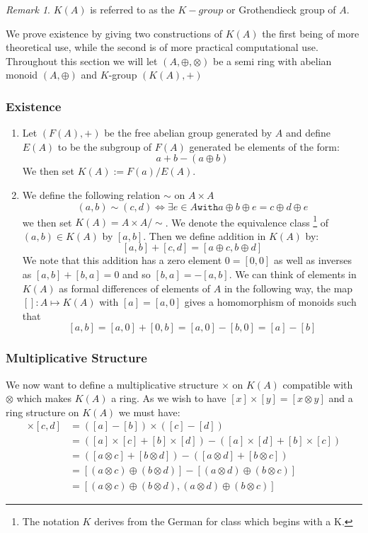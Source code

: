 \documentclass[a4paper,10pt]{article}
\theoremstyle{plain}%
\theoremstyle{definition}
\theoremstyle{remark}
\newtheorem{rem}{Remark}
\begin{document}
\begin{rem}
 $K(A)$ is referred to as the $K-group$ or Grothendieck group of $A$.
\end{rem}


We prove existence by giving two constructions of $K(A)$ the first being of more theoretical use, while the second 
is of more practical computational use. Throughout this section we will let $(A,\oplus,\otimes)$ be a semi ring with abelian monoid $(A,\oplus)$ and $K$-group $(K(A),+)$

\subsubsection{Existence}

\begin{enumerate}
 \item Let $(F(A),+)$ be the free abelian group generated by $A$ and define $E(A)$ to be the subgroup of $F(A)$
generated be elements of the form:
$$a+b-(a\oplus b)$$
We then set $K(A):=F(a)/E(A)$.
 \item We define the following relation $\sim$ on $A\times A$
$$(a,b)\sim (c,d) \iff \exists e\in A \mathtt{ with } a\oplus b\oplus e =c\oplus d\oplus e$$
we then set $K(A)=A\times A/\sim$. We denote the equivalence class
\footnote{The notation $K$ derives from the German for class which begins with a K.}
 of $(a,b)\in K(A)$  by $[a,b]$.
Then we define addition in $K(A)$ by:
$$[a,b]+[c,d]=[a\oplus c,b\oplus d]$$
We note that this addition has a zero element $0=[0,0]$ as well as inverses as $[a,b]+[b,a]=0$ and so $[b,a]=-[a,b]$.
We can think of elements in $K(A)$  as formal differences of elements of $A$ in the following way,
the map $[ ]:A\mapsto K(A)$ with $[a]=[a,0]$ gives a homomorphism of monoids such that
$$[a,b]=[a,0]+[0,b]=[a,0]-[b,0]=[a]-[b]$$
\end{enumerate}

\subsubsection{Multiplicative Structure}

We now want to define a multiplicative structure $\times$ on $K(A)$ compatible with $\otimes$ which makes $K(A)$
a ring. As we wish to have $[x]\times[y]=[x\otimes y]$ and a ring structure on $K(A)$ we must have:
\begin{align*}
 [a,b]\times[c,d] &= ([a]-[b])\times([c]-[d])\\
		  &= ([a]\times[c]+[b]\times[d])-([a]\times[d]+[b]\times[c])\\
		  &= ([a\otimes c]+[b\otimes d])-([a\otimes d]+[b\otimes c])\\
		  &= [(a\otimes c)\oplus(b\otimes d)]-[(a\otimes d)\oplus(b\otimes c)]\\
		  &= [(a\otimes c)\oplus(b\otimes d),(a\otimes d)\oplus(b\otimes c)]
\end{align*}
\end{document}
